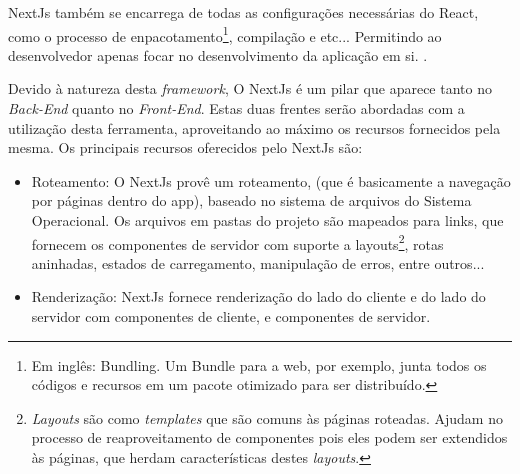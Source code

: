 NextJs também se encarrega de todas as configurações necessárias do React, como o processo
de
enpacotamento\footnote{Em inglês: Bundling. Um Bundle para a \acrshort{web},
    por exemplo, junta todos os códigos e recursos em um pacote otimizado
    para ser distribuído.
},
compilação e etc...
Permitindo ao desenvolvedor apenas focar no desenvolvimento da aplicação em si.
\cite{nexjs-docs}.

Devido à natureza desta \textit{framework}, O NextJs é um pilar que aparece
tanto no \textit{Back-End} quanto no \textit{Front-End}. Estas duas frentes serão abordadas
com a utilização desta ferramenta, aproveitando ao máximo os recursos fornecidos
pela mesma. Os principais recursos oferecidos pelo NextJs são:

\begin{itemize}
        
	\item Roteamento: O NextJs provê um roteamento, (que é basicamente a navegação por páginas
                    dentro do app), baseado no sistema de arquivos do Sistema Operacional. Os arquivos
                    em pastas do projeto são mapeados para links, que fornecem os componentes de servidor
                    com suporte a
                    layouts\footnote{\textit{Layouts} são como \textit{templates} que são comuns às páginas roteadas. Ajudam no processo
                        de reaproveitamento de componentes pois eles podem ser extendidos às páginas,
                        que herdam características destes \textit{layouts}.
                    },
                    rotas aninhadas, estados de carregamento, manipulação de erros,
                    entre outros...
                
	\item Renderização: NextJs fornece renderização do lado do cliente e do lado do servidor com
                    componentes de cliente, e componentes de servidor.
                

\end{itemize}
